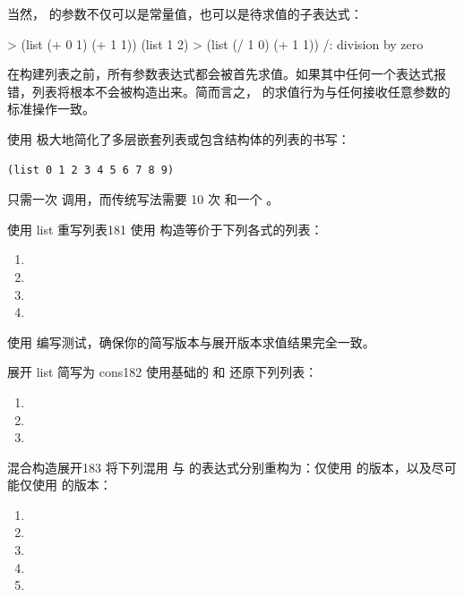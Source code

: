 当然， 的参数不仅可以是常量值，也可以是待求值的子表达式：
\begin{replbox}
> (list (+ 0 1) (+ 1 1))
(list 1 2)
> (list (/ 1 0) (+ 1 1))
/: division by zero
\end{replbox}
在构建列表之前，所有参数表达式都会被首先求值。如果其中任何一个表达式报错，列表将根本不会被构造出来。简而言之， 的求值行为与任何接收任意参数的标准操作一致。

使用  极大地简化了多层嵌套列表或包含结构体的列表的书写：
\begin{lstlisting}[language=BSL]
(list 0 1 2 3 4 5 6 7 8 9)
\end{lstlisting}
只需一次  调用，而传统写法需要 10 次  和一个 。

\begin{exercise}{使用 list 重写列表}{181}
使用  构造等价于下列各式的列表：
\begin{enumerate}
  \item {}
  \item {}
  \item {}
  \item {}
\end{enumerate}
使用  编写测试，确保你的简写版本与展开版本求值结果完全一致。
\end{exercise}

\begin{exercise}{展开 list 简写为 cons}{182}
使用基础的  和  还原下列列表：
\begin{enumerate}
  \item {}
  \item {}
  \item {}
\end{enumerate}
\end{exercise}

\begin{exercise}{混合构造展开}{183}
将下列混用  与  的表达式分别重构为：仅使用  的版本，以及尽可能仅使用  的版本：
\begin{enumerate}
  \item {}
  \item {}
  \item {}
  \item {}
  \item {}
\end{enumerate}
\end{exercise}

